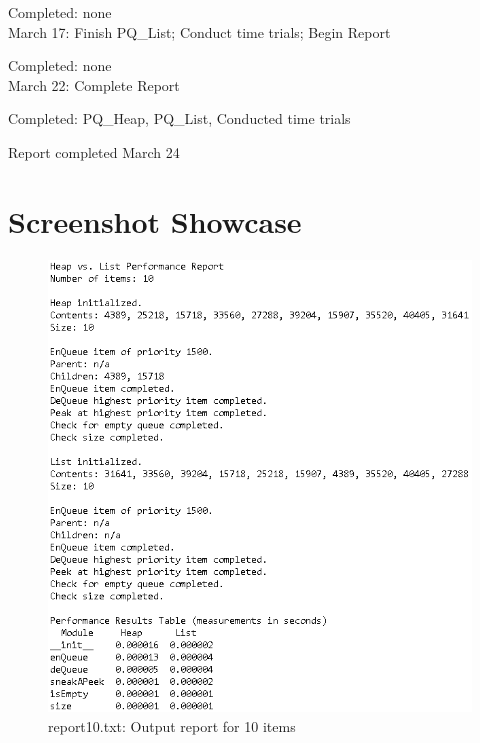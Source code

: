 \documentclass{article}
\begin{document}
Completed: none\\
March 17: Finish PQ\_List; Conduct time trials; Begin Report

Completed: none\\
March 22: Complete Report

Completed: PQ\_Heap, PQ\_List, Conducted time trials

Report completed March 24

\newpage
\section{Screenshot Showcase}
\begin{figure}[H]
    \centering
    \includegraphics{report10.PNG}
    \caption{report10.txt: Output report for 10 items}
\end{figure}
\end{document}
